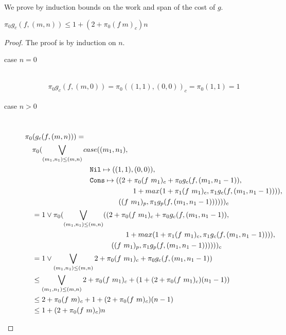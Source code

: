 %
We prove by induction bounds on the work and span of the cost of $g$.
%
\begin{lemma}
$\pi_0 g_c(f, (m, n)) \leq 1 + (2 + \pi_0(f\ m)_c)n$
\end{lemma}
%
\begin{proof}
   The proof is by induction on $n$.
  \begin{description}
    \item[case $n=0$]\mbox{}\\[-1.5\baselineskip]
      \begin{align*}
      \pi_0 g_c(f, (m, 0)) = \pi_0((1, 1), (0, 0))_c = \pi_0(1, 1) = 1
      \end{align*}
    \item[case $n>0$]\mbox{}\\[-1.5\baselineskip]
      \[\begin{split}
        &\pi_0(g_c(f, (m, n))) = \\
        &\quad \pi_0(\bigvee\limits_{(m_1, n_1) \leq (m, n)} case((m_1, n_1), \\
        &\quadfive\quadfour \T{Nil} \mapsto ((1, 1), (0, 0)), \\
        &\quadfive\quadfour \T{Cons} \mapsto ((2 + \pi_0(f\ m_1)_c + \pi_0g_c(f, (m_1, n_1-1)), \\
        &\quadfive\quadten                     1 + max(1 + \pi_1(f\ m_1)_c, \pi_1g_c(f, (m_1, n_1-1)))), \\
        &\quadfive\quadeight                  ((f\ m_1)_p, \pi_1 g_p(f, (m_1, n_1-1))))) )_c \\
        &\quad = 1 \vee \pi_0(\bigvee\limits_{(m_1, n_1) \leq (m, n)} ((2 + \pi_0(f\ m_1)_c + \pi_0g_c(f, (m_1, n_1-1)), \\
        &\quadfour\quadten                     1 + max(1 + \pi_1(f\ m_1)_c, \pi_1g_c(f, (m_1, n_1-1)))), \\
        &\quadfour\quadeight                  ((f\ m_1)_p, \pi_1 g_p(f, (m_1, n_1-1))))) )_c \\
        &\quad = 1 \vee \bigvee\limits_{(m_1, n_1) \leq (m, n)} 2 + \pi_0 (f\ m_1)_c + \pi_0 g_c(f, (m_1, n_1-1)) \\
        &\quad \leq \bigvee\limits_{(m_1, n_1) \leq (m, n)} 2 + \pi_0 (f\ m_1)_c + (1 + (2 + \pi_0 (f\ m_1)_c)(n_1-1)) \\
        &\quad \leq 2 + \pi_0 (f\ m)_c + 1 + (2 + \pi_0 (f\ m)_c)(n - 1) \\
        &\quad \leq 1 + (2 + \pi_0 (f\ m)_c)n \\
      \end{split}\]
  \end{description}
\end{proof}

